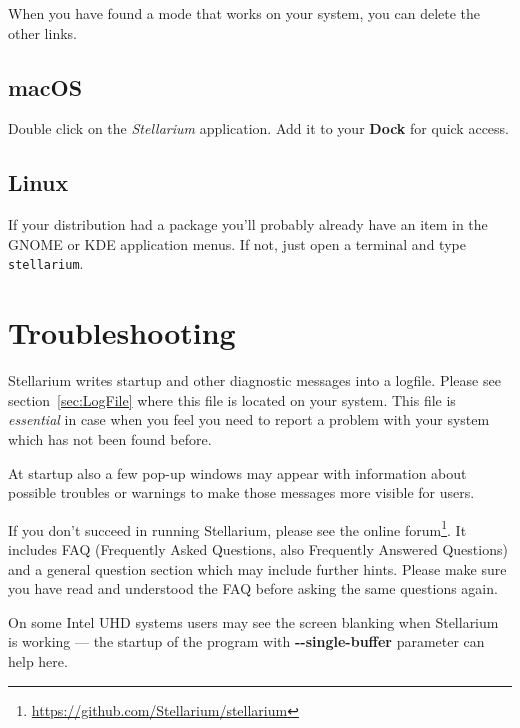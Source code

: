 When you have found a mode that works on your system, you can delete
the other links.

\subsection{macOS}
\label{sec:GettingStarted:Running:macOS}

Double click on the \emph{Stellarium} application.  Add it to your
\textbf{Dock} for quick access.

\subsection{Linux}
\label{sec:GettingStarted:Running:Linux}

If your distribution had a package you'll probably already have an
item in the GNOME or KDE application menus. If not, just open a
terminal and type \texttt{stellarium}.


\section{Troubleshooting}
\label{sec:GettingStarted:Running:Troubleshooting}

Stellarium writes startup and other diagnostic messages into a
logfile. Please see section~\ref{sec:LogFile} where this
file is located on your system. This file is \emph{essential} in case when
you feel you need to report a problem with your system which has not
been found before.

At startup also a few pop-up windows may appear
with information about possible troubles or warnings to make those
messages more visible for users.

If you don't succeed in running Stellarium, please see the online
forum\footnote{\url{https://github.com/Stellarium/stellarium}}.  It includes
FAQ (Frequently Asked Questions, also Frequently Answered
Questions) and a general question section which may include
further hints. Please make sure you have read and understood the FAQ
before asking the same questions again.

On some Intel UHD systems %
users may see the screen blanking when Stellarium is working --- the startup of the program with \textbf{-\/-single-buffer} parameter can help here.


